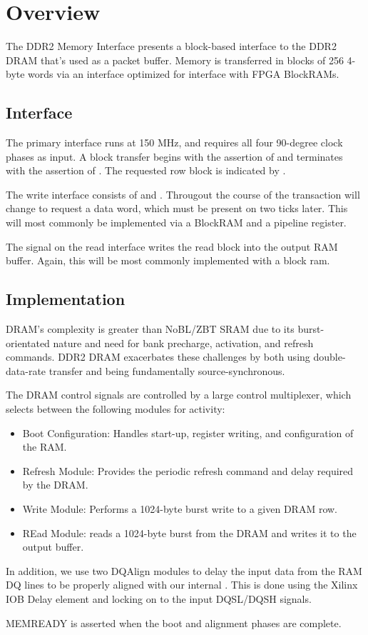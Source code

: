 \section{Overview}

The DDR2 Memory Interface presents a block-based interface to the DDR2
DRAM that's used as a packet buffer. Memory is transferred in blocks
of 256 4-byte words via an interface optimized for interface with FPGA
BlockRAMs.


\subsection{Interface}
The primary interface runs at 150 MHz, and requires all four 90-degree
clock phases as input. A block transfer begins with the assertion of
 and terminates with the assertion of . The
requested row block is indicated by .

The write interface consists of  and
. Througout the course of the transaction
 will change to request a data word, which must be
present on  two ticks later. This will most
commonly be implemented via a BlockRAM and a pipeline register.

The  signal on the read interface writes the read block
into the output RAM buffer. Again, this will be most commonly
implemented with a block ram.

\subsection{Implementation} 
DRAM's complexity is greater than NoBL/ZBT SRAM due to its
burst-orientated nature and need for bank precharge, activation, and
refresh commands. DDR2 DRAM exacerbates these challenges by both using
double-data-rate transfer and being fundamentally source-synchronous.

The DRAM control signals are controlled by a large control
multiplexer, which selects between the following modules for activity:

\begin{itemize}
\item Boot Configuration: Handles start-up, register writing, and configuration of the RAM. 
\item Refresh Module: Provides the periodic refresh command and delay required by the DRAM. 
\item Write Module: Performs a 1024-byte burst write to a given DRAM row. 
\item REad Module: reads a 1024-byte burst from the DRAM and writes it to the output buffer. 
\end{itemize}

In addition, we use two DQAlign modules to delay the input data from
the RAM DQ lines to be properly aligned with our internal
. This is done using the Xilinx IOB Delay element and
locking on to the input DQSL/DQSH signals.

MEMREADY is asserted when the boot and alignment phases are complete. 
